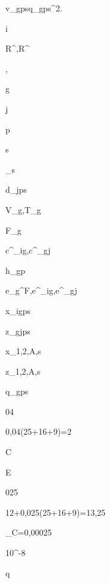 v_{gps}\ge\widehat q_{gps}^{2}.

i

R^{},R^{}

\alpha,\beta

g

j

p

s

\pi_s

d_{jps}

V_g,T_g

F_g

c^{}_{ig},c^{}_{gj}

h_{gp}

e_g^F,e^{}_{ig},e^{}_{gj}

x_{igps}

z_{gjps}

x_{1,2,A,s}

z_{1,2,A,s}

q_{gps}


04

0{,}04(25+16+9)=2

C

E


025

12+0{,}025(25+16+9)=13{,}25

\varepsilon

\delta_C=0{,}00025

10^{-8}

\widehat q

